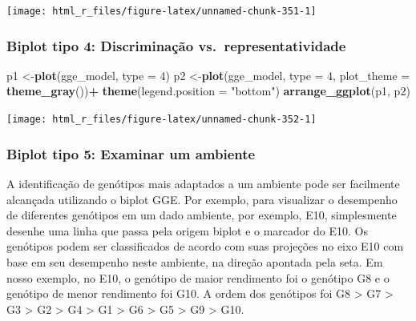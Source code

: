 \documentclass[
]{book}
\newenvironment{Shaded}{\begin{snugshade}}{\end{snugshade}}
\newcommand{\DataTypeTok}[1]{\textcolor[rgb]{0.13,0.29,0.53}{#1}}
\newcommand{\DecValTok}[1]{\textcolor[rgb]{0.00,0.00,0.81}{#1}}
\newcommand{\KeywordTok}[1]{\textcolor[rgb]{0.13,0.29,0.53}{\textbf{#1}}}
\newcommand{\NormalTok}[1]{#1}
\newcommand{\OperatorTok}[1]{\textcolor[rgb]{0.81,0.36,0.00}{\textbf{#1}}}
\newcommand{\StringTok}[1]{\textcolor[rgb]{0.31,0.60,0.02}{#1}}
\numberwithin{equation}{section}
\newcommand{\indt}[1]{\index{#1|ST}}
\begin{document}
\begin{center}\texttt{[image: html\_r\_files/figure-latex/unnamed-chunk-351-1]} \end{center}

\hypertarget{biplot-tipo-4-discriminauxe7uxe3o-vs.-representatividade}{%
\subsubsection{Biplot tipo 4: Discriminação vs.~representatividade}\label{biplot-tipo-4-discriminauxe7uxe3o-vs.-representatividade}}

\indt{biplot}

\begin{Shaded}
\begin{Highlighting}[]
\NormalTok{p1 \textless{}{-}}\KeywordTok{plot}\NormalTok{(gge\_model, }\DataTypeTok{type =} \DecValTok{4}\NormalTok{)}
\NormalTok{p2 \textless{}{-}}\KeywordTok{plot}\NormalTok{(gge\_model,}
          \DataTypeTok{type =} \DecValTok{4}\NormalTok{,}
          \DataTypeTok{plot\_theme =} \KeywordTok{theme\_gray}\NormalTok{())}\OperatorTok{+}
\StringTok{  }\KeywordTok{theme}\NormalTok{(}\DataTypeTok{legend.position =} \StringTok{"bottom"}\NormalTok{)}
\KeywordTok{arrange\_ggplot}\NormalTok{(p1, p2)}
\end{Highlighting}
\end{Shaded}

\begin{center}\texttt{[image: html\_r\_files/figure-latex/unnamed-chunk-352-1]} \end{center}

\hypertarget{biplot-tipo-5-examinar-um-ambiente}{%
\subsubsection{Biplot tipo 5: Examinar um ambiente}\label{biplot-tipo-5-examinar-um-ambiente}}

A identificação de genótipos mais adaptados a um ambiente pode ser facilmente alcançada utilizando o biplot GGE. Por exemplo, para visualizar o desempenho de diferentes genótipos em um dado ambiente, por exemplo, E10, simplesmente desenhe uma linha que passa pela origem biplot e o marcador do E10. Os genótipos podem ser classificados de acordo com suas projeções no eixo E10 com base em seu desempenho neste ambiente, na direção apontada pela seta. Em nosso exemplo, no E10, o genótipo de maior rendimento foi o genótipo G8 e o genótipo de menor rendimento foi G10. A ordem dos genótipos foi G8 \textgreater{} G7 \textgreater{} G3 \textgreater{} G2 \textgreater{} G4 \textgreater{} G1 \textgreater{} G6 \textgreater{} G5 \textgreater{} G9 \textgreater{} G10.
\indt{biplot}
\end{document}
